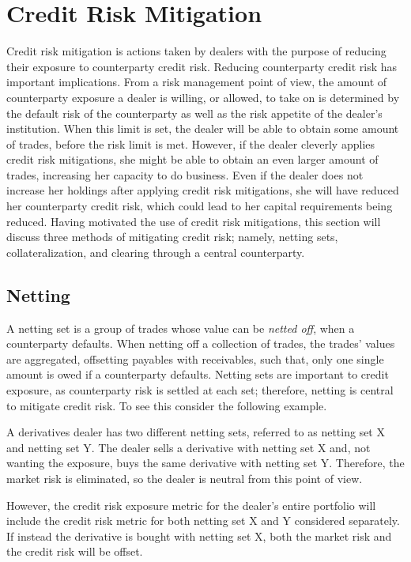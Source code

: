 \documentclass[main.tex]{subfiles}
\begin{document}
    \section{Credit Risk Mitigation}
    
    Credit risk mitigation is actions taken by dealers 
    with the purpose of reducing their exposure to counterparty credit risk.
    Reducing counterparty credit risk has important implications.
    From a risk management point of view,
    the amount of counterparty exposure a dealer is willing, or allowed, to take on 
    is determined by the default risk of the counterparty 
    as well as the risk appetite of the dealer's institution.
    When this limit is set, the dealer will be able to obtain some amount of trades,
    before the risk limit is met.
    However, if the dealer cleverly applies credit risk mitigations,
    she might be able to obtain an even larger amount of trades,
    increasing her capacity to do business.
    Even if the dealer does not increase her holdings after applying credit risk mitigations,
    she will have reduced her counterparty credit risk,
    which could lead to her capital requirements being reduced.
    Having motivated the use of credit risk mitigations,
    this section will discuss three methods of mitigating credit risk;
    namely, netting sets, collateralization, and clearing through a central counterparty.

    \subsection{Netting}
        A netting set is a group of trades whose value can be \textit{netted off}, 
        when a counterparty defaults.
        When netting off a collection of trades, the trades' values are aggregated,
        offsetting payables with receivables, such that,
        only one single amount is owed if a counterparty defaults.
        Netting sets are important to credit exposure, 
        as counterparty risk is settled at each set;
        therefore, netting is central to mitigate credit risk.
        To see this consider the following example.

        \begin{example}    
        A derivatives dealer has two different netting sets, 
        referred to as netting set X and netting set Y.
        The dealer sells a derivative with netting set X and, 
        not wanting the exposure, buys the same derivative with netting set Y.
        Therefore, the market risk is eliminated, so the dealer is neutral from this point of view.

        However, the credit risk exposure metric for the dealer's entire portfolio will include 
        the credit risk metric for both netting set X and Y considered separately.
        If instead the derivative is bought with netting set X,
        both the market risk and the credit risk will be offset.
        \end{example}
\end{document}
